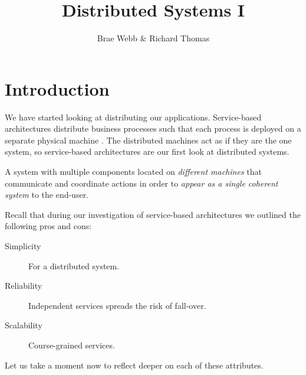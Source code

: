 \title{Distributed Systems I}
\author{Brae Webb \& Richard Thomas}
\date{}

\maketitle

\section{Introduction}
We have started looking at distributing our applications.
Service-based architectures distribute business processes such that each process is deployed on a separate physical machine \cite{service-based-notes}.
The distributed machines act as if they are the one system,
so service-based architectures are our first look at distributed systems.

\begin{definition}
A system with multiple components located on \textsl{different machines} that communicate and coordinate actions in order to \textsl{appear as a single coherent system} to the end-user.
\end{definition}

\noindent Recall that during our investigation of service-based architectures we outlined the following pros and cons:
\begin{description}
    \item[Simplicity] For a distributed system.
    \item[Reliability] Independent services spreads the risk of fall-over.
    \item[Scalability] Course-grained services.
\end{description}

\noindent Let us take a moment now to reflect deeper on each of these attributes.

